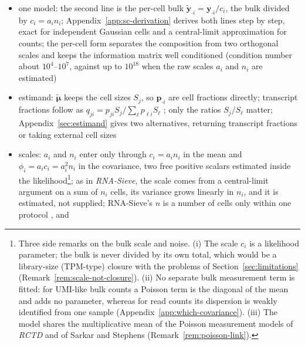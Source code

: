 \documentclass[pdflatex, sn-nature]{sn-jnl}
\theoremstyle{thmstyleone}%
\theoremstyle{thmstyletwo}%
\theoremstyle{thmstylethree}%
\begin{document}
\begin{itemize}
  \item one model: the second line is the per-cell bulk \(\tilde{\boldsymbol{y}}_{\cdot i}=\boldsymbol{y}_{\cdot i}/c_{i}\), the bulk divided by
        \(c_{i}=a_{i}n_{i}\);
        Appendix~\ref{app:sc-derivation} derives both lines step by step, exact for independent Gaussian cells and a
        central-limit approximation for counts; the per-cell form separates the composition from two orthogonal
        scales and keeps the information matrix well conditioned (condition number about \(10^{4}\)--\(10^{7}\), against
        up to \(10^{18}\) when the raw scales \(a_{i}\) and \(n_{i}\) are estimated)
  \item estimand: \(\tilde{\boldsymbol{\mu}}\) keeps the cell sizes \(S_{j}\), so \(\boldsymbol{p}_{\cdot i}\) are cell fractions
        directly; transcript fractions follow as \(q_{ji}=p_{ji}S_{j}/\sum_{\ell}p_{\ell i}S_{\ell}\)
        \cite{wangBulkTissueCell2019,racleSimultaneousEnumerationCancer2017}; only the ratios \(S_{j}/S_{\ell}\) matter;
        Appendix~\ref{sec:estimand} gives two alternatives, returning transcript fractions or taking external cell sizes
  \item scales: \(a_{i}\) and \(n_{i}\) enter only through \(c_{i}=a_{i}n_{i}\) in the mean and
        \(\phi_{i}=a_{i}c_{i}=a_{i}^{2}n_{i}\) in the covariance, two free positive scalars estimated inside the
        likelihood\footnote{Three side remarks on the bulk scale and noise. (i) The scale \(c_{i}\) is a likelihood
        parameter; the bulk is never divided by its own total, which would be a library-size (TPM-type) closure with the
        problems of Section~\ref{sec:limitations} (Remark~\ref{rem:scale-not-closure}). (ii) No separate bulk measurement
        term is fitted: for UMI-like bulk counts a Poisson term is the diagonal of the mean and adds no parameter, whereas
        for read counts its dispersion is weakly identified from one sample (Appendix~\ref{app:which-covariance}).
        (iii) The model shares the multiplicative mean of the Poisson measurement models of \emph{RCTD}
        \cite{cableRobustDecompositionCell2022a} and of Sarkar and Stephens \cite{sarkarSeparatingMeasurementExpression2021}
        (Remark~\ref{rem:poisson-link}).}; as in \emph{RNA-Sieve}, the scale comes from a central-limit argument on a
        sum of \(n_{i}\) cells, its variance grows linearly in \(n_{i}\), and it is estimated, not supplied; RNA-Sieve's
        \(n\) is a number of cells only within one protocol \cite{erdmann-phamLikelihoodbasedDeconvolutionBulk2021}, and

\end{itemize}
\end{document}
